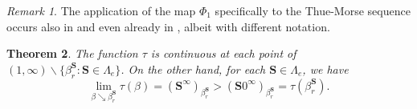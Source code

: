 \documentclass[12pt]{amsart}
\newtheorem{theorem}{Theorem}[section]
\theoremstyle{definition}
\theoremstyle{remark}
\newtheorem{remark}[theorem]{Remark}
\numberwithin{equation}{section}
\renewcommand{\L}{\ensuremath{\mathbb{L}}}
\newcommand{\s}{ {\mathbf{s}}}
\newcommand{\cs}{ {\mathbf{S}}}
\newcommand{\f}{\infty}
\newcommand{\La}{\Lambda}
\begin{document}
{\begin{remark}
{\rm
The application of the map $\Phi_1$ specifically to the Thue-Morse sequence occurs also in \cite{Allouche-Frougny-2009} and even already in \cite{Allouche-1983}, albeit with different notation.
}
\end{remark}



\begin{theorem} \label{prop:discontinuities}
The function $\tau$ is continuous at each point of $(1,\f)\backslash \{\beta_r^\cs: \cs\in\La_e\}$. On the other hand, for each $\cs\in\La_e$, we have
\begin{equation} \label{eq:upward-jump}
\lim_{\beta\searrow\beta_r^\cs}\tau(\beta)=(\cs^\f)_{\beta_r^\cs}>(\cs 0^\f)_{\beta_r^\cs}=\tau(\beta_r^\cs).
\end{equation}
\end{theorem}

}
\end{document}
